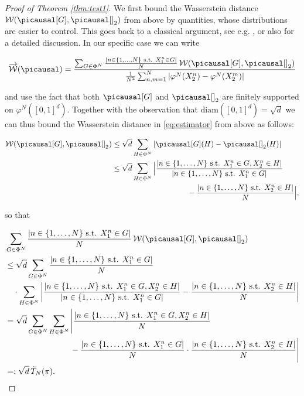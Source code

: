 \documentclass[10pt]{amsart}
\begin{document}
\begin{appendix}
\begin{proof}[Proof of Theorem \ref{thm:test1}]
We first bound the Wasserstein distance $\mathcal{W}(\picausal[G], \picausal[]_2)$ from above by quantities, whose distributions are easier to control. This goes back to a classical argument, see e.g. \cite[Lemma 5]{fournier2015rate}, or also \cite[Appendix A]{weed2017sharp} for a detailed discussion. In our specific case we can write

\begin{align}\label{eq:estimator}
\overrightarrow{\mathcal{W}}(\picausal)=\frac{\sum_{G\in \Phi^N} \frac{|n\in \{1, \dots, N\} \text{ s.t. } X_1^n\in G|}{N}\, \mathcal{W}( \picausal[G], \picausal[]_2) } {\frac{1}{N^2}\sum_{n,m=1}^N |\varphi^N(X_2^n)-\varphi^N(X_2^m)|}
\end{align}

and use the fact that both  $\picausal[G]$ and $\picausal[]_2$ are finitely supported on $\varphi^N([0,1]^d)$.  Together with the observation that $\text{diam}([0,1]^d)=\sqrt{d}$ we can thus bound the Wasserstein distance in \eqref{eq:estimator} from above as follows:

\begin{align*}
\mathcal{W}( \picausal[G], \picausal[]_2)&\le \sqrt{d} \sum_{H\in\Phi^N} |\picausal[G](H)- \picausal[]_2(H)|\\
&\le  \sqrt{d} \sum_{H\in\Phi^N} \Big|\frac{|n\in \{1,\dots, N\} \text{ s.t. } X_1^n\in G, X_2^n\in H|}{|n\in \{1, \dots, N\} \text{ s.t. } X_1^n\in G|}\\
&\qquad\qquad\qquad\qquad\qquad- \frac{|n\in \{1,\dots, N\} \text{ s.t. } X_2^n\in H|}{N}\Big|,
\end{align*}

so that

\begin{align*}
&\sum_{G\in \Phi^N} \frac{|n\in \{1, \dots, N\} \text{ s.t. } X_1^n\in G|}{N}\, \mathcal{W}( \picausal[G], \picausal[]_2)\\
&\le 
\sqrt{d}
\sum_{G\in \Phi^N}\frac{|n\in \{1, \dots, N\} \text{ s.t. } X_1^n\in G|}{N}  \\
&\quad\cdot  \sum_{H\in\Phi^N} \left|\frac{|n\in \{1,\dots, N\} \text{ s.t. } X_1^n\in G, X_2^n\in H|}{|n\in \{1, \dots, N\} \text{ s.t. } X_1^n\in G|}- \frac{|n\in \{1,\dots, N\} \text{ s.t. } X_2^n\in H|}{N}\right|\\
&=\sqrt{d}
\sum_{G\in \Phi^N} \sum_{H\in\Phi^N} \Bigg|\frac{|n\in \{1,\dots, N\} \text{ s.t. } X_1^n\in G, X_2^n\in H|}{N}\\
&\qquad\qquad\qquad\qquad- \frac{|n\in \{1, \dots, N\} \text{ s.t. } X_1^n\in G|}{N}\cdot \frac{|n\in \{1,\dots, N\} \text{ s.t. } X_2^n\in H|}{N}\Bigg|\\
&=:\sqrt{d}\,\tilde{T}_N(\pi).
\end{align*}


\end{proof}
\end{appendix}
\end{document}
